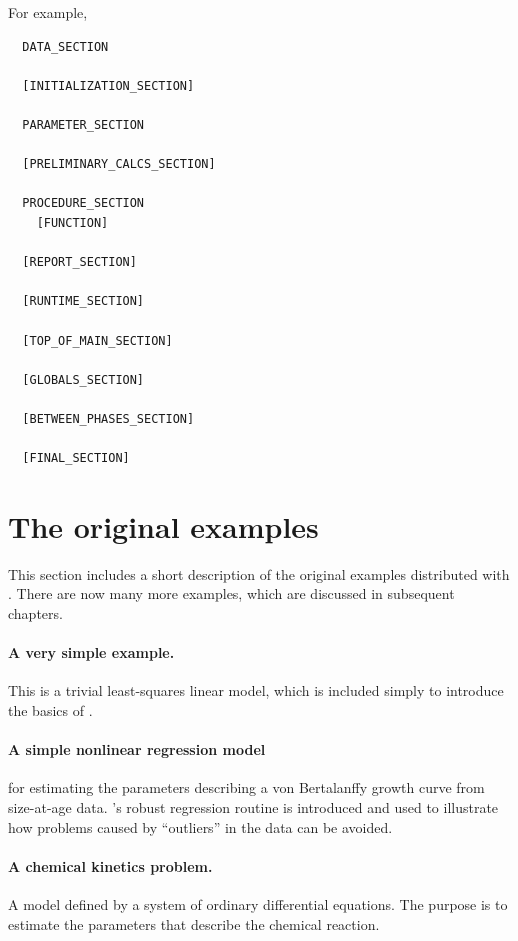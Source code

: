 \documentclass{admbmanual}
\begin{document}
For example,
\begin{lstlisting}
  DATA_SECTION
  
  [INITIALIZATION_SECTION]
  
  PARAMETER_SECTION

  [PRELIMINARY_CALCS_SECTION]

  PROCEDURE_SECTION
    [FUNCTION]
  
  [REPORT_SECTION]

  [RUNTIME_SECTION]

  [TOP_OF_MAIN_SECTION]

  [GLOBALS_SECTION]

  [BETWEEN_PHASES_SECTION]

  [FINAL_SECTION]
\end{lstlisting}


\section{The original \ADMS examples}

This section includes a short description of the original
examples distributed with \ADM. There are now many more examples,
which are discussed in subsequent chapters.


\paragraph{A very simple example.} This is a trivial least-squares
linear model, which is included simply to introduce the basics of 
\ADM.

\paragraph{A simple nonlinear regression model} for estimating the parameters
describing a von Bertalanffy growth curve from size-at-age data.
\ADM's robust regression routine is introduced and used to illustrate
how problems caused by ``outliers'' in the data can be avoided. 

\paragraph{A chemical kinetics problem.}  A model defined by a
system of ordinary differential equations. The purpose is to
estimate the parameters that describe the chemical reaction.  
\end{document}
